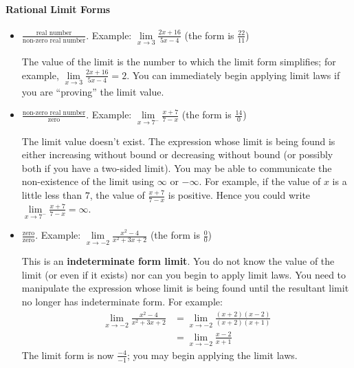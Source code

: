 \documentclass[12pt,]{book}
\newcommand{\terminology}[1]{\textbf{#1}}
\theoremstyle{plain}
\theoremstyle{definition}
\numberwithin{equation}{section}
\begin{document}
\paragraph[Rational Limit Forms]{Rational Limit Forms}\label{paragraphs-77}
\begin{itemize}[label=\textbullet]
\item{}\(\frac{\text{real number}}{\text{non-zero real number}}\). Example: \(\lim\limits_{x\to3}\frac{2x+16}{5x-4}\) (the form is \(\frac{22}{11}\))%

                \par
The value of the limit is the number to which the limit form simplifies; for example, \(\lim\limits_{x\to3}\frac{2x+16}{5x-4}=2\). You can immediately begin applying limit laws if you are ``proving'' the limit value. %
\end{itemize}
\begin{itemize}[label=\textbullet]
\item{}\(\frac{\text{non-zero real number}}{\text{zero}}\). Example: \(\lim\limits_{x\to7^{-}}\frac{x+7}{7-x}\) (the form is \(\frac{14}{0}\))%

                \par
The limit value doesn't exist. The expression whose limit is being found is either increasing without bound or decreasing without bound (or possibly both if you have a two-sided limit).   You may be able to communicate the non-existence of the limit using \(\infty\) or \(-\infty\). For example, if the value of \(x\) is a little less than \(7\), the value of \(\frac{x+7}{7-x}\) is positive.  Hence you could write \(\lim\limits_{x\to7^{-}}\frac{x+7}{7-x}=\infty\).%
\end{itemize}
\begin{itemize}[label=\textbullet]
\item{}\(\frac{\text{zero}}{\text{zero}}\). Example: \(\lim\limits_{x\to-2}\frac{x^2-4}{x^2+3x+2}\) (the form is \(\frac{0}{0}\))%

                \par
This is an \terminology{indeterminate form limit}. You do not know the value of the limit (or even if it exists) nor can you begin to apply limit laws.  You need to manipulate the expression whose limit is being found until the resultant limit no longer has indeterminate form.  For example:\begin{align*}
\lim_{x\to-2}\frac{x^2-4}{x^2+3x+2}&=\lim_{x\to-2}\frac{(x+2)(x-2)}{(x+2)(x+1)}\\
&=\lim_{x\to-2}\frac{x-2}{x+1}
\end{align*}The limit form is now \(\frac{-4}{-1}\); you may begin applying the limit laws.%
\end{itemize}
\end{document}
